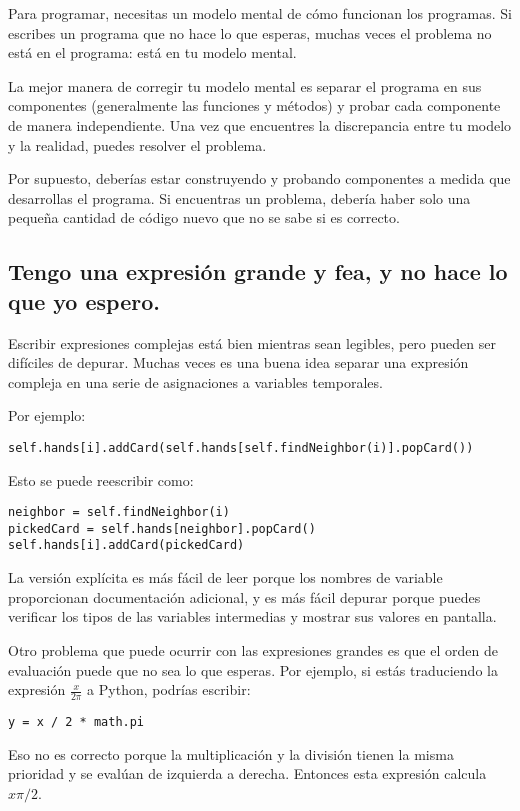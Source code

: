 \documentclass[10pt]{book}
\begin{document}
Para programar, necesitas un modelo mental de cómo
funcionan los programas.  Si escribes un programa que no hace lo que esperas,
muchas veces el problema no está en el programa: está en tu modelo
mental.

La mejor manera de corregir tu modelo mental es separar el programa
en sus componentes (generalmente las funciones y métodos) y probar
cada componente de manera independiente.  Una vez que encuentres la discrepancia
entre tu modelo y la realidad, puedes resolver el problema.

Por supuesto, deberías estar construyendo y probando componentes a medida que
desarrollas el programa.  Si encuentras un problema,
debería haber solo una pequeña cantidad de código nuevo
que no se sabe si es correcto.


\subsection{Tengo una expresión grande y fea, y no
hace lo que yo espero.}

Escribir expresiones complejas está bien mientras sean legibles,
pero pueden ser difíciles de depurar.  Muchas veces es una buena idea
separar una expresión compleja en una serie de asignaciones a
variables temporales.

Por ejemplo:

\begin{verbatim}
self.hands[i].addCard(self.hands[self.findNeighbor(i)].popCard())
\end{verbatim}
%
Esto se puede reescribir como:

\begin{verbatim}
neighbor = self.findNeighbor(i)
pickedCard = self.hands[neighbor].popCard()
self.hands[i].addCard(pickedCard)
\end{verbatim}
%
La versión explícita es más fácil de leer porque los nombres de variable
proporcionan documentación adicional, y es más fácil depurar
porque puedes verificar los tipos de las variables intermedias
y mostrar sus valores en pantalla.

Otro problema que puede ocurrir con las expresiones grandes es que
el orden de evaluación puede que no sea lo que esperas.
Por ejemplo, si estás traduciendo la expresión
$\frac{x}{2 \pi}$ a Python, podrías escribir:

\begin{verbatim}
y = x / 2 * math.pi
\end{verbatim}
%
Eso no es correcto porque la multiplicación y la división tienen
la misma prioridad y se evalúan de izquierda a derecha.
Entonces esta expresión calcula $x \pi / 2$.
\end{document}
